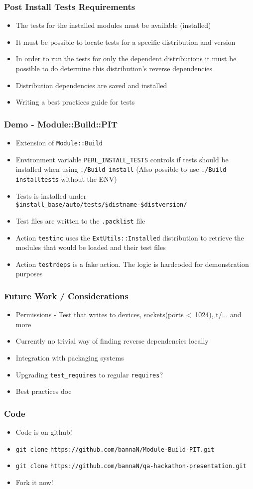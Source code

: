 \documentclass[10pt]{beamer}
\begin{document}
\begin{frame}
\frametitle{Post Install Tests Requirements}
\begin{itemize}
\item The tests for the installed modules must be available (installed)
\item It must be possible to locate tests for a specific distribution and version
\item In order to run the tests for only the dependent distributions it must be possible to do determine this distribution's reverse dependencies
\item Distribution dependencies are saved and installed
\item Writing a best practices guide for tests
\end{itemize}
\end{frame}

\begin{frame}[fragile]
\frametitle{Demo - Module::Build::PIT}
\begin{itemize}
\item Extension of \verb|Module::Build|
\item Environment variable \verb|PERL_INSTALL_TESTS| controls if tests should be installed when using  \verb|./Build install| (Also possible to use \verb|./Build installtests| without the ENV)
\item Tests is installed under \verb|$install_base/auto/tests/$distname-$distversion/|
\item Test files are written to the \verb|.packlist| file
\item Action \verb|testinc| uses the \verb|ExtUtils::Installed| distribution to retrieve the modules that would be loaded and their test files
\item Action \verb|testrdeps| is a fake action. The logic is hardcoded for demonstration purposes
\end{itemize}
\end{frame}

\begin{frame}[fragile]
\frametitle{Future Work / Considerations}
\begin{itemize}
\item Permissions - Test that writes to devices, sockets(ports \textless \ 1024), t/... and more
\item Currently no trivial way of finding reverse dependencies locally
\item Integration with packaging systems
\item Upgrading \verb|test_requires| to regular \verb|requires|?
\item Best practices doc
\end{itemize}
\end{frame}

\begin{frame}[fragile]
\frametitle{Code}
\begin{itemize}
\item Code is on github!
\item \verb|git clone| \verb|https://github.com/bannaN/Module-Build-PIT.git|
\item \verb|git clone| \verb|https://github.com/bannaN/qa-hackathon-presentation.git|
\item Fork it now!
\end{itemize}
\end{frame}
\end{document}

